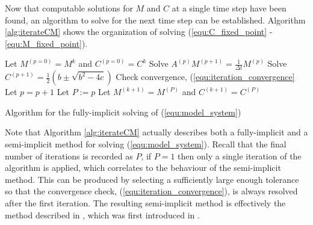Now that computable solutions for $M$ and $C$ at a single time step have been found, an algorithm to solve for the next time step can be established.
Algorithm \ref{alg:iterateCM} shows the organization of solving (\ref{equ:C_fixed_point} - \ref{equ:M_fixed_point}). 

\begin{algorithm}[!htp]
  \Begin
  {
    Let $M^{(p=0)} = M^{k}$ and $C^{(p=0)} = C^{k}$\;
    {
        Solve $A^{(p)} M^{(p+1)} = \frac{1}{\Delta t}M^{(p)}$\;
        Solve $C^{(p+1)} = \frac{1}{2} \left( b \pm \sqrt{b^2 - 4c} \right)$\;
        Check convergence, (\ref{equ:iteration_convergence}\; 
        Let $p = p + 1 $\;
    }
    Let $P := p$\;
    Let $M^{(k+1)} = M^{(P)}$ and $C^{(k+1)} = C^{(P)}$\;
  }
  \caption{Algorithm for the fully-implicit solving of (\ref{equ:model_system}) }
  \label{alg:iterateCM}
\end{algorithm}

Note that Algorithm \ref{alg:iterateCM} actually describes both a fully-implicit and a semi-implicit method for solving (\ref{equ:model_system}). 
Recall that the final number of iterations is recorded as $P$, if $P = 1$ then only a single iteration of the algorithm is applied, which correlates to the behaviour of the semi-implicit method.
This can be produced by selecting a sufficiently large enough tolerance so that the convergence check, (\ref{equ:iteration_convergence}), is always resolved after the first iteration.
The resulting semi-implicit method is effectively the method described in \cite{sirca2012computational}, which was first introduced in \cite{eberl2007finite}.



